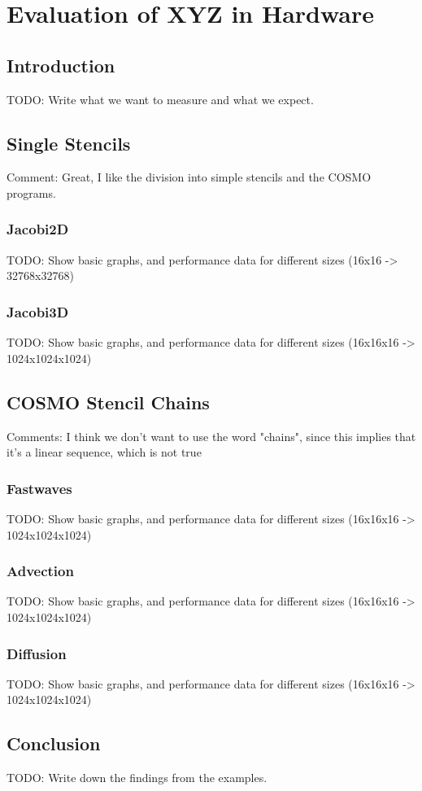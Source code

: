 \chapter{Evaluation of XYZ in Hardware}


\section{Introduction}
TODO: Write what we want to measure and what we expect.


\section{Single Stencils}
Comment: Great, I like the division into simple stencils and the COSMO programs.

\subsection{Jacobi2D}
TODO: Show basic graphs, and performance data for different sizes (16x16 -> 32768x32768)

\subsection{Jacobi3D}
TODO: Show basic graphs, and performance data for different sizes (16x16x16 -> 1024x1024x1024)


\section{COSMO Stencil Chains}
Comments: I think we don't want to use the word "chains", since this implies that it's a linear sequence, which is not true

\subsection{Fastwaves}
TODO: Show basic graphs, and performance data for different sizes (16x16x16 -> 1024x1024x1024)

\subsection{Advection}
TODO: Show basic graphs, and performance data for different sizes (16x16x16 -> 1024x1024x1024)

\subsection{Diffusion}
TODO: Show basic graphs, and performance data for different sizes (16x16x16 -> 1024x1024x1024)


\section{Conclusion}
TODO: Write down the findings from the examples.